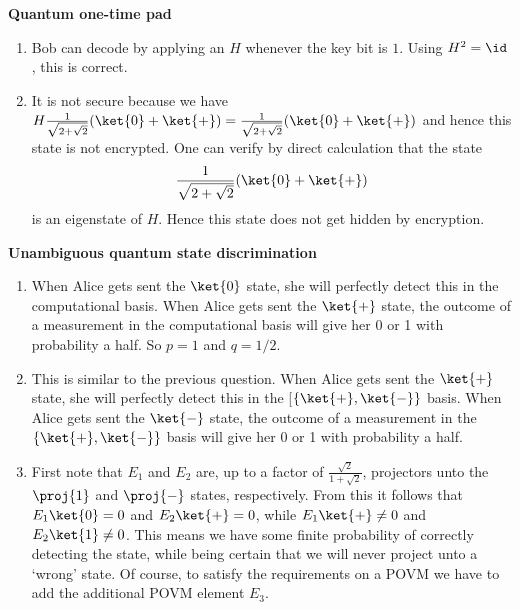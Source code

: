 \begin{exercises}
\item {\bf Quantum one-time pad}
\begin{enumerate}
\item Bob can decode by applying an $H$ whenever the key bit is $1$. Using $H^2=\id$, this is correct.

\item It is not secure because we have \(H\frac{1}{\sqrt{2+\sqrt{2}}}(\ket{0}+ \ket{+}) = \frac{1}{\sqrt{2+\sqrt{2}}}(\ket{0}+ \ket{+})\) and hence this state is not encrypted. One can verify by direct calculation that the state \[\frac{1}{\sqrt{2+\sqrt{2}}}(\ket{0}+ \ket{+})\] is an eigenstate of \(H\). Hence this state does not get hidden by encryption.
\end{enumerate}


\item {\bf Unambiguous quantum state discrimination}
\begin{enumerate}
\item When Alice gets sent the $\ket{0}$ state, she will perfectly detect this in the computational basis. When Alice gets sent the $\ket{+}$ state, the outcome of a measurement in the computational basis will give her 0 or 1 with probability a half. So $p=1$ and $q=1/2$.

\item This is similar to the previous question. When Alice gets sent the $\ket{+}$ state, she will perfectly detect this in the [$ \{\ket{+},\ket{-}\}$  basis. When Alice gets sent the $\ket{-}$ state, the outcome of a measurement in the $\{\ket{+},\ket{-}\}$ basis will give her 0 or 1 with probability a half.

\item First note that $E_1$ and $E_2$ are, up to a factor of $\frac{\sqrt{2}}{1+\sqrt{2}}$, projectors unto the $\proj{1}$ and $\proj{-}$ states, respectively. From this it follows that $E_1\ket{0} = 0$ and $E_2\ket{+} = 0$, while $E_1\ket{+} \neq 0$ and $E_2\ket{1} \neq 0$. This means we have some finite probability of correctly detecting the state, while being certain that we will never project unto a `wrong' state. Of course, to satisfy the requirements on a POVM we have to add the additional POVM element $E_3$.
\end{enumerate}



\end{exercises}
